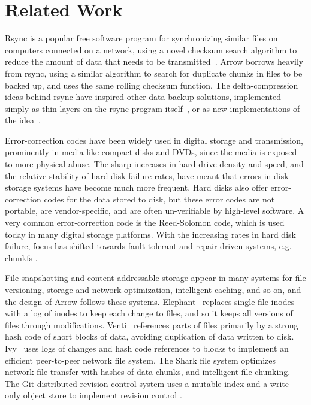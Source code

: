 \documentclass{article}
\begin{document}
\section{Related Work}

Rsync is a popular free software program for synchronizing similar
files on computers connected on a network, using a novel checksum
search algorithm to reduce the amount of data that needs to be
transmitted~\cite{tridge:thesis, tridge:96}. Arrow borrows heavily
from rsync, using a similar algorithm to search for duplicate chunks
in files to be backed up, and uses the same rolling checksum
function. The delta-compression ideas behind rsync have inspired other
data backup solutions, implemented simply as thin layers on the rsync
program itself~\cite{rsnapshot}, or as new implementations of the
idea~\cite{rdiff-backup}.

Error-correction codes have been widely used in digital storage and
transmission, prominently in media like compact disks and DVDs, since
the media is exposed to more physical abuse. The sharp increases in
hard drive density and speed, and the relative stability of hard disk
failure rates, have meant that errors in disk storage systems have
become much more frequent. Hard disks also offer error-correction
codes for the data stored to disk, but these error codes are not
portable, are vendor-specific, and are often un-verifiable by
high-level software. A very common error-correction code is the
Reed-Solomon code, which is used today in many digital storage
platforms. With the increasing rates in hard disk failure, focus has
shifted towards fault-tolerant and repair-driven systems, e.g. chunkfs
\cite{henson06chunkfs}.

File snapshotting and content-addressable storage appear in many
systems for file versioning, storage and network optimization,
intelligent caching, and so on, and the design of Arrow follows these
systems.  Elephant~\cite{elephant-sosp} replaces single file inodes
with a log of inodes to keep each change to files, and so it keeps all
versions of files through modifications. Venti~\cite{quinlan02venti}
references parts of files primarily by a strong hash code of short
blocks of data, avoiding duplication of data written to disk.
Ivy~\cite{ivy:osdi02} uses logs of changes and hash code references to
blocks to implement an efficient peer-to-peer network file system.
The Shark file system \cite{shark:ndsi05} optimizes network file
transfer with hashes of data chunks, and intelligent file chunking.
The Git distributed revision control system uses a mutable index and a
write-only object store to implement revision control
\cite{git08wiegley}.
\end{document}
